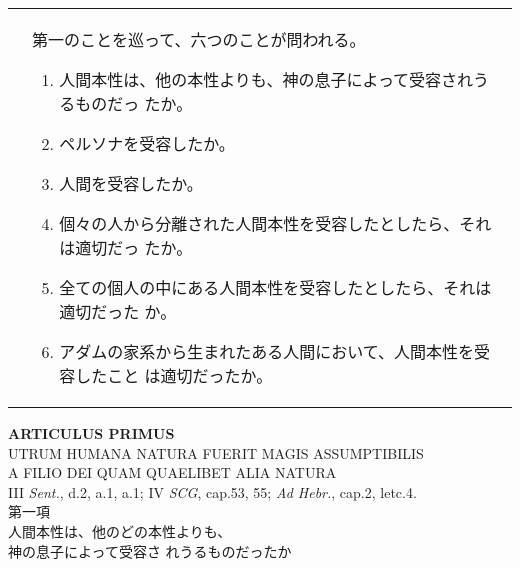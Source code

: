 \documentclass[10pt]{jsarticle} %
\begin{document}
\begin{longtable}{p{21em}p{21em}}
&

第一のことを巡って、六つのことが問われる。
\begin{enumerate}
 \item 人間本性は、他の本性よりも、神の息子によって受容されうるものだっ
       たか。
 \item ペルソナを受容したか。
 \item 人間を受容したか。
 \item 個々の人から分離された人間本性を受容したとしたら、それは適切だっ
       たか。
 \item 全ての個人の中にある人間本性を受容したとしたら、それは適切だった
       か。
 \item アダムの家系から生まれたある人間において、人間本性を受容したこと
       は適切だったか。
\end{enumerate}

\end{longtable}

\newpage



\begin{center}
 {\Large {\bf ARTICULUS PRIMUS}}\\
 {\large UTRUM HUMANA NATURA FUERIT MAGIS ASSUMPTIBILIS\\A FILIO DEI
 QUAM QUAELIBET ALIA NATURA}\\
 {\footnotesize III {\itshape Sent.}, d.2, a.1, a.1; IV {\itshape SCG},
 cap.53, 55; {\itshape Ad Hebr.}, cap.2, letc.4.}\\
 {\Large 第一項\\人間本性は、他のどの本性よりも、\\神の息子によって受容さ
 れうるものだったか}
\end{center}
\end{document}
